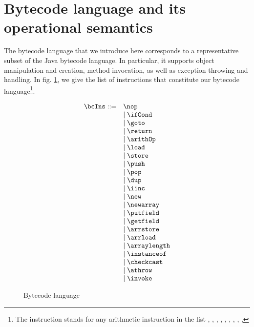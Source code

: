 
\newtheorem{StateTransition}{Definition}[section]
\newtheorem{transClosStateTrans0}[StateTransition]{Definition}
\newtheorem{transClosStateTrans1}[StateTransition]{Definition}



\section{Bytecode language and its operational semantics} \label{opSem}
 The bytecode language that we introduce here corresponds to a representative subset of the Java bytecode language. 
 In particular, it supports object manipulation and creation, method invocation, as well as exception throwing and handling. In fig. \ref{opSem:bclang}, we give the list of instructions that constitute our bytecode language\footnote{The instruction \arithOp{} stands for any arithmetic instruction in the list  , , , 
 , ,  , , , ,  }.
 
\begin{figure}[h] 
\begin{frameit}
      $$  \begin{array}{ll}
             \bcIns ::= & \nop \\
	                & \mid \ifCond \\
	                & \mid \goto  \\ 
			& \mid \return  \\ 
			& \mid \arithOp  \\ 
			& \mid \load \\ 
			& \mid \store \\
			& \mid \push \\
			& \mid \pop \\
			& \mid \dup \\
			& \mid \iinc \\
			& \mid \new \\
			& \mid \newarray   \\ 	
			& \mid \putfield  \\
			& \mid \getfield  \\
			& \mid \arrstore   \\
			& \mid \arrload  \\
			& \mid \arraylength  \\
			& \mid \instanceof  \\
			& \mid \checkcast \\
			& \mid \athrow  \\
			& \mid \invoke  \\
	\end{array}$$
        \caption{\sc Bytecode language}
        \label{opSem:bclang}
\end{frameit}
\end{figure}  
 	 

